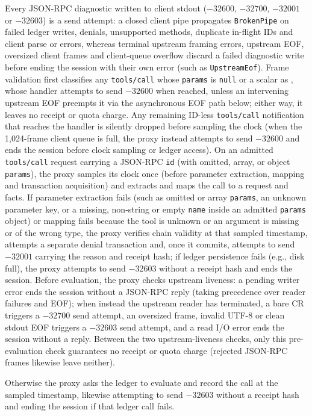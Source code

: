 \documentclass[10pt,twocolumn]{article}
\theoremstyle{plain}
\theoremstyle{definition}
\begin{document}
Every JSON-RPC diagnostic written to client stdout ($-32600$, $-32700$, $-32001$ or $-32603$) is a send attempt: a closed client pipe propagates \texttt{BrokenPipe} on failed ledger writes, denials, unsupported methods, duplicate in-flight IDs and client parse or  errors, whereas terminal upstream framing errors, upstream EOF, oversized client frames and client-queue overflow discard a failed diagnostic write before ending the session with their own error (such as \texttt{UpstreamEof}). Frame validation first classifies any \texttt{tools/call} whose \texttt{params} is \texttt{null} or a scalar as , whose handler attempts to send $-32600$ when reached, unless an intervening upstream EOF preempts it via the asynchronous EOF path below; either way, it leaves no receipt or quota charge. Any remaining ID-less \texttt{tools/call} notification that reaches the handler is silently dropped before sampling the clock (when the 1{,}024-frame client queue is full, the proxy instead attempts to send $-32600$ and ends the session before clock sampling or ledger access). On an admitted \texttt{tools/call} request carrying a JSON-RPC \texttt{id} (with omitted, array, or object \texttt{params}), the proxy samples its clock once (before parameter extraction, mapping and transaction acquisition) and extracts and maps the call to a request and facts. If parameter extraction fails (such as omitted or array \texttt{params}, an unknown parameter key, or a missing, non-string or empty \texttt{name} inside an admitted \texttt{params} object) or mapping fails because the tool is unknown or an argument is missing or of the wrong type, the proxy verifies chain validity at that sampled timestamp, attempts a separate denial transaction and, once it commits, attempts to send $-32001$ carrying the reason and receipt hash; if ledger persistence fails (e.g., disk full), the proxy attempts to send $-32603$ without a receipt hash and ends the session. Before evaluation, the proxy checks upstream liveness: a pending writer error ends the session without a JSON-RPC reply (taking precedence over reader failures and EOF); when instead the upstream reader has terminated, a bare CR triggers a $-32700$ send attempt, an oversized frame, invalid UTF-8 or clean stdout EOF triggers a $-32603$ send attempt, and a read I/O error ends the session without a reply. Between the two upstream-liveness checks, only this pre-evaluation check guarantees no receipt or quota charge (rejected JSON-RPC frames likewise leave neither).\par Otherwise the proxy asks the ledger to evaluate and record the call at the sampled timestamp, likewise attempting to send $-32603$ without a receipt hash and ending the session if that ledger call fails.
\end{document}
